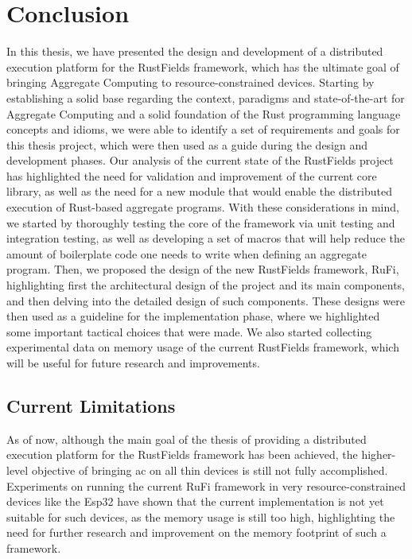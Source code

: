 
\chapter{Conclusion}
\label{chap:conclusions}
In this thesis, we have presented the design and development of a distributed execution platform for the RustFields framework, which has the ultimate goal of bringing Aggregate Computing to resource-constrained devices.
Starting by establishing a solid base regarding the context, paradigms and state-of-the-art for Aggregate Computing and a solid foundation of the Rust programming language concepts and idioms,
we were able to identify a set of requirements and goals for this thesis project, which were then used as a guide during the design and development phases.
Our analysis of the current state of the RustFields project has highlighted the need for validation and improvement of the current core library, as well as the need for a new module that would enable
the distributed execution of Rust-based aggregate programs. With these considerations in mind, we started by thoroughly testing the core of the framework via unit testing and integration testing, as well as developing
a set of macros that will help reduce the amount of boilerplate code one needs to write when defining an aggregate program. Then, we proposed the design of the new RustFields framework, RuFi, highlighting first the architectural design of the project and its main
components, and then delving into the detailed design of such components. These designs were then used as a guideline for the implementation phase, where we highlighted some important tactical choices that were made.
We also started collecting experimental data on memory usage of the current RustFields framework, which will be useful for future research and improvements.

\section{Current Limitations}
As of now, although the main goal of the thesis of providing a distributed execution platform for the RustFields framework has been achieved, the higher-level objective of bringing \ac{ac} on all thin devices is still not fully accomplished.
Experiments on running the current RuFi framework in very resource-constrained devices like the Esp32 have shown that the current implementation is not yet suitable for such devices, as the memory usage is still too high, highlighting the need
for further research and improvement on the memory footprint of such a framework.

